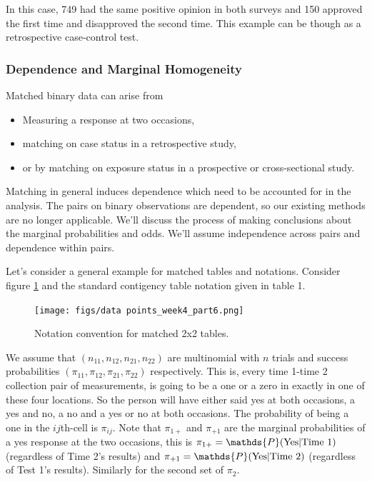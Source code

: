\documentclass{homework}
\begin{document}
In this case, 749 had the same positive opinion in both surveys and 150 approved the first time and disapproved the second time. This example can be though as a retrospective case-control test. 

\subsubsection{Dependence and Marginal Homogeneity}

Matched binary data can arise from 

\begin{itemize}
    \item Measuring a response at two occasions, 
    \item matching on case status in a retrospective study,
    \item or by matching on exposure status in a prospective or cross-sectional study.
\end{itemize}

Matching in general induces dependence which need to be accounted for in the analysis. 
The pairs on binary observations are dependent, so our existing methods are no longer applicable. We'll discuss the process of making conclusions about the marginal probabilities and odds. We'll assume independence across pairs and dependence within pairs. 

Let's consider a general example for matched tables and notations. Consider figure \ref{fig:notations} and the standard contigency table notation given in table 1.  

\begin{figure}
    \centering
    \texttt{[image: figs/data points\_week4\_part6.png]}
    \caption{Notation convention for matched 2x2 tables.}
    \label{fig:notations}
\end{figure}

We assume that $(n_{11},n_{12}, n_{21},n_{22})$ are multinomial with $n$ trials and success probabilities $(\pi_{11},\pi_{12},\pi_{21},\pi_{22})$ respectively. This is, every time 1-time 2 collection pair of measurements, is going to be a one or a zero in exactly in one of these four locations. So the person will have either said yes at both occasions, a yes and no, a no and a yes or no at both occasions. The probability of being a one in the $ij$th-cell is $\pi_{ij}$. Note that $\pi_{1+}$ and $\pi_{+1}$ are the marginal probabilities of a yes response at the two occasions, this is $\pi_{1+} = \mathds{P}(\textnormal{Yes}|\textnormal{Time 1})$ (regardless of Time 2's results) and $\pi_{+1} = \mathds{P}(\textnormal{Yes}|\textnormal{Time 2})$ (regardless of Test 1's results). Similarly for the second set of $\pi_2$.\\
\end{document}
